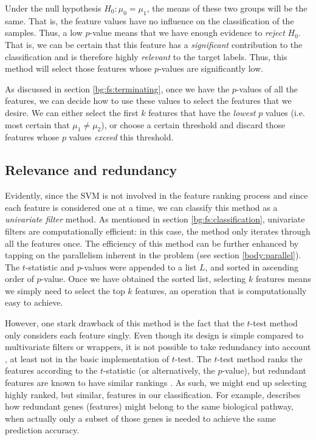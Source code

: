 \documentclass[12pt, twoside, a4paper]{report}
\begin{document}
Under the null hypothesis $H_0: \mu_0 = \mu_1$, the means of these two groups will be the same. That is, the feature values have no influence on the classification of the samples. Thus, a low $p$-value means that we have enough evidence to \textit{reject} $H_0$. That is, we can be certain that this feature has a \textit{significant} contribution to the classification and is therefore highly \textit{relevant} to the target labels. Thus, this method will select those features whose $p$-values are significantly low.

As discussed in section \ref{bg:fs:terminating}, once we have the $p$-values of all the features, we can decide how to use these values to select the features that we desire. We can either select the first $k$ features that have the \textit{lowest} $p$ values (i.e. most certain that $\mu_1 \neq \mu_2$), or choose a certain threshold and discard those features whose $p$ values \textit{exceed} this threshold.

\subsection{Relevance and redundancy}

Evidently, since the SVM is not involved in the feature ranking process and since each feature is considered one at a time, we can classify this method as a \textit{univariate filter} method. As mentioned in section \ref{bg:fs:classification}, univariate filters are computationally efficient: in this case, the method only iterates through all the features once. The efficiency of this method can be further enhanced by tapping on the parallelism inherent in the problem (see section \ref{body:parallel}). The $t$-statistic and $p$-values were appended to a list $L$, and sorted in ascending order of $p$-value. Once we have obtained the sorted list, selecting $k$ features means we simply need to select the top $k$ features, an operation that is computationally easy to achieve.

However, one stark drawback of this method is the fact that the $t$-test method only considers each feature singly. Even though its design is simple compared to multivariate filters or wrappers, it is not possible to take redundancy into account \cite{RefWorks:217}, at least not in the basic implementation of $t$-test. The $t$-test method ranks the features according to the $t$-statistic (or alternatively, the $p$-value), but redundant features are known to have similar rankings \cite{RefWorks:163}. As such, we might end up selecting highly ranked, but similar, features in our classification. For example, \cite{RefWorks:220} describes how redundant genes (features) might belong to the same biological pathway, when actually only a subset of those genes is needed to achieve the same prediction accuracy.
\end{document}
